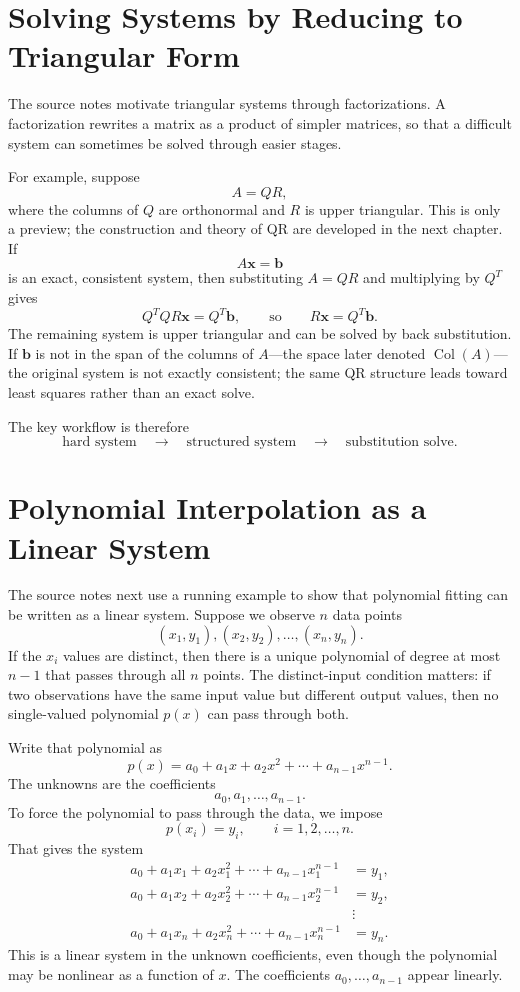 \section{Solving Systems by Reducing to Triangular Form}
\label{mf:linear-systems-factorization-bridge}

The source notes motivate triangular systems through factorizations. A factorization rewrites a matrix as a product of simpler matrices, so that a difficult system can sometimes be solved through easier stages.

For example, suppose
\[
    A=QR,
\]
where the columns of \(Q\) are orthonormal and \(R\) is upper triangular. This is only a preview; the construction and theory of QR are developed in the next chapter. If
\[
    A\mathbf{x}=\mathbf{b}
\]
is an exact, consistent system, then substituting \(A=QR\) and multiplying by \(Q^T\) gives
\[
    Q^TQR\mathbf{x}=Q^T\mathbf{b},
    \qquad \text{so} \qquad
    R\mathbf{x}=Q^T\mathbf{b}.
\]
The remaining system is upper triangular and can be solved by back substitution. If \(\mathbf{b}\) is not in the span of the columns of \(A\)---the space later denoted \(\operatorname{Col}(A)\)---the original system is not exactly consistent; the same QR structure leads toward least squares rather than an exact solve.

The key workflow is therefore
\[
    \text{hard system}
    \quad\longrightarrow\quad
    \text{structured system}
    \quad\longrightarrow\quad
    \text{substitution solve}.
\]

\section{Polynomial Interpolation as a Linear System}
\label{mf:polynomial-systems}
\label{mf:polynomial-interpolation}

The source notes next use a running example to show that polynomial fitting can be written as a linear system. Suppose we observe \(n\) data points
\[
    (x_1,y_1),(x_2,y_2),\ldots,(x_n,y_n).
\]
If the \(x_i\) values are distinct, then there is a unique polynomial of degree at most \(n-1\) that passes through all \(n\) points. The distinct-input condition matters: if two observations have the same input value but different output values, then no single-valued polynomial \(p(x)\) can pass through both.

Write that polynomial as
\[
    p(x)=a_0+a_1x+a_2x^2+\cdots+a_{n-1}x^{n-1}.
\]
The unknowns are the coefficients
\[
    a_0,a_1,\ldots,a_{n-1}.
\]
To force the polynomial to pass through the data, we impose
\[
    p(x_i)=y_i, \qquad i=1,2,\ldots,n.
\]
That gives the system
\[
    \begin{aligned}
    a_0+a_1x_1+a_2x_1^2+\cdots+a_{n-1}x_1^{n-1} &= y_1,\\
    a_0+a_1x_2+a_2x_2^2+\cdots+a_{n-1}x_2^{n-1} &= y_2,\\
    &\vdots\\
    a_0+a_1x_n+a_2x_n^2+\cdots+a_{n-1}x_n^{n-1} &= y_n.
    \end{aligned}
\]
This is a linear system in the unknown coefficients, even though the polynomial may be nonlinear as a function of \(x\). The coefficients \(a_0,\ldots,a_{n-1}\) appear linearly.

